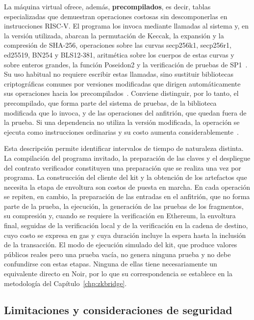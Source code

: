 La máquina virtual ofrece, además, \textbf{precompilados}, es decir, tablas especializadas que
demuestran operaciones costosas sin descomponerlas en instrucciones RISC-V. El programa los invoca
mediante llamadas al sistema y, en la versión utilizada, abarcan la permutación de Keccak, la
expansión y la compresión de SHA-256, operaciones sobre las curvas secp256k1, secp256r1, ed25519,
BN254 y BLS12-381, aritmética sobre los cuerpos de estas curvas y sobre enteros grandes, la función
Poseidon2 y la verificación de pruebas de SP1~\cite{sp1repo}. Su uso habitual no requiere escribir
estas llamadas, sino sustituir bibliotecas criptográficas comunes por versiones modificadas que
dirigen automáticamente sus operaciones hacia los precompilados~\cite{sp1docsv6}. Conviene
distinguir, por lo tanto, el precompilado, que forma parte del sistema de pruebas, de la biblioteca
modificada que lo invoca, y de las operaciones del anfitrión, que quedan fuera de la prueba. Si una
dependencia no utiliza la versión modificada, la operación se ejecuta como instrucciones ordinarias
y su costo aumenta considerablemente~\cite{sp1docsv6}.

Esta descripción permite identificar intervalos de tiempo de naturaleza distinta. La compilación
del programa invitado, la preparación de las claves y el despliegue del contrato verificador
constituyen una preparación que se realiza una vez por programa. La construcción del cliente del
kit y la obtención de los artefactos que necesita la etapa de envoltura son costos de puesta en
marcha. En cada operación se repiten, en cambio, la preparación de las entradas en el anfitrión,
que no forma parte de la prueba, la ejecución, la generación de las pruebas de los fragmentos, su
compresión y, cuando se requiere la verificación en Ethereum, la envoltura final, seguidas de la
verificación local y de la verificación en la cadena de destino, cuyo costo se expresa en gas y cuya
duración incluye la espera hasta la inclusión de la transacción. El modo de ejecución simulado del
kit, que produce valores públicos reales pero una prueba vacía, no genera ninguna prueba y no debe
confundirse con estas etapas. Ninguna de ellas tiene necesariamente un equivalente directo en Noir,
por lo que su correspondencia se establece en la metodología del Capítulo~\ref{chp:zkbridge}.

\subsection{Limitaciones y consideraciones de seguridad}
\label{sec:sp1_limitaciones}

